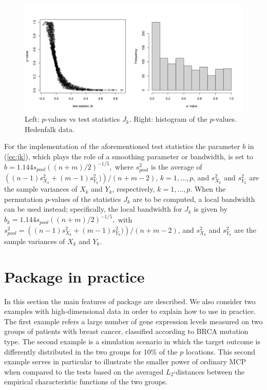 \begin{figure}[htb]
	\centering
	\includegraphics[width=1\textwidth]{figanti.jpg}
	\caption{Left: $p$-values vs test statistics $J_k$. Right: histogram of the $p$-values. Hedenfalk data.}
	\label{figanti}
\end{figure}

For the implementation of the aforementioned test statistics the parameter $b$ in (\ref{ec:jk}), which plays the role of a smoothing parameter or bandwidth, is set to  $\widehat{b}=1.144 s_{pool} \left(({n+m})/{2}\right)^{-1/5},$
where $s_{pool}^2$ is the average of
$\left((n-1)s_{X_k}^2+(m-1)s_{Y_k}^2)\right)/(n+m-2)$, $k=1, \dots,p$, and
$s_{X_k}^2$ and $s_{Y_k}^2$ are the sample variances of $X_k$ and
$Y_k$, respectively, $k=1, \dots, p$. When the permutation $p$-values of the statistics $J_k$ are to be computed, a local bandwidth can be used instead; specifically, the local bandwidth for $J_k$ is given by $\widehat{b}_k=1.144 s_{pool} \left(({n+m})/{2}\right)^{-1/5},$ with $s_{pool}^2=\left((n-1)s_{X_k}^2+(m-1)s_{Y_k}^2)\right)/(n+m-2)$, and $s_{X_k}^2$ and $s_{Y_k}^2$ are the sample variances of $X_k$ and
$Y_k$.

\section{Package  in practice}\label{se:pra}

In this section the main features of  package are described.  We also consider two examples with high-dimensional data in order to explain how to use  in practice. The first example refers a large number of gene expression levels measured on two groups of patients
with breast cancer, classified according to BRCA mutation type.  The
second example is a simulation scenario in which the target outcome is differently distributed in the two groups for 10\% of the $p$ locations. This second example serves in particular to illustrate the smaller power of ordinary MCP when compared to the tests based on the averaged $L_2$-distances between the empirical characteristic functions of the two groups.



